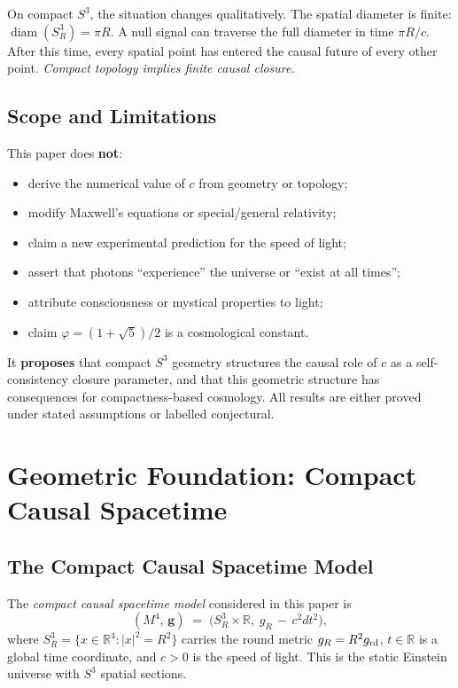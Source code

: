 \documentclass[12pt,a4paper]{article}
\theoremstyle{plain}
\theoremstyle{definition}
\theoremstyle{remark}
\newcommand{\vph}{\varphi}
\newcommand{\diam}{\operatorname{diam}}
\begin{document}
On compact $S^3$, the situation changes qualitatively.
The spatial diameter is finite: $\diam(S^3_R) = \pi R$.
A null signal can traverse the full diameter in time $\pi R/c$.
After this time, every spatial point has entered the causal future of
every other point.
\emph{Compact topology implies finite causal closure.}

\subsection{Scope and Limitations}
\label{subsec:scope}

\begin{tcolorbox}[limbox={What This Paper Does NOT Claim}]
This paper does \textbf{not}:
\begin{itemize}[leftmargin=1.4em]
  \item derive the numerical value of $c$ from geometry or topology;
  \item modify Maxwell's equations or special/general relativity;
  \item claim a new experimental prediction for the speed of light;
  \item assert that photons ``experience'' the universe or ``exist at all times'';
  \item attribute consciousness or mystical properties to light;
  \item claim $\vph = (1+\sqrt{5})/2$ is a cosmological constant.
\end{itemize}
It \textbf{proposes} that compact $S^3$ geometry structures the causal role of
$c$ as a self-consistency closure parameter, and that this geometric structure
has consequences for compactness-based cosmology.
All results are either proved under stated assumptions or labelled conjectural.
\end{tcolorbox}

\section{Geometric Foundation: Compact Causal Spacetime}
\label{sec:geometry}

\subsection{The Compact Causal Spacetime Model}

\begin{tcolorbox}[defbox={Definition 2.1 — Compact Causal Spacetime}]
The \emph{compact causal spacetime model} considered in this paper is
\begin{equation}
  (M^4,\, \mathbf{g})
  \;=\;
  \bigl(S^3_R \times \mathbb{R},\;
  g_R \,-\, c^2 dt^2\bigr),
  \label{eq:spacetime}
\end{equation}
where $S^3_R = \{x \in \mathbb{R}^4 : |x|^2 = R^2\}$ carries the round metric
$g_R = R^2 g_{\rm rd}$, $t \in \mathbb{R}$ is a global time coordinate,
and $c > 0$ is the speed of light.
This is the static Einstein universe with $S^3$ spatial sections.
\end{tcolorbox}
\end{document}
